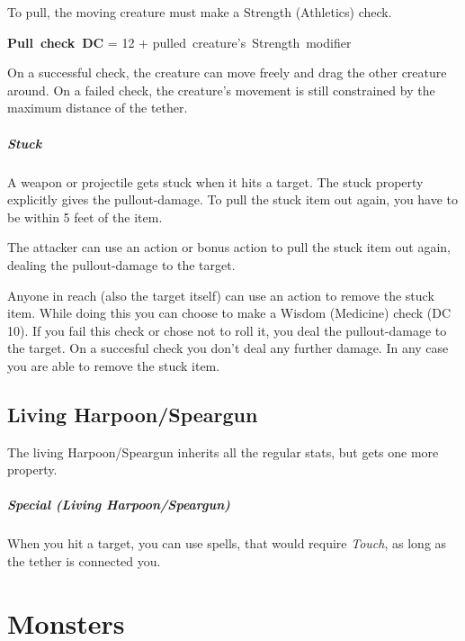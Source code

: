\documentclass[letterpaper,twocolumn,openany,nodeprecatedcode]{dndbook}
\begin{document}
To pull, the moving creature must make a Strength (Athletics) check.

\begin{center}
    \mbox{\bf Pull check DC} = \mbox{12} + \mbox{pulled creature's Strength modifier}
\end{center}

On a successful check, the creature can move freely and drag the other creature around.
On a failed check, the creature's movement is still constrained by the maximum distance of the tether.

\subparagraph{Stuck}
A weapon or projectile gets stuck when it hits a target.
The stuck property explicitly gives the pullout-damage.
To pull the stuck item out again, you have to be within 5 feet of the item.

The attacker can use an action or bonus action to pull the stuck item out again, dealing the pullout-damage to the target.

Anyone in reach (also the target itself) can use an action to remove the stuck item.
While doing this you can choose to make a Wisdom (Medicine) check (DC 10).
If you fail this check or chose not to roll it, you deal the pullout-damage to the target.
On a succesful check you don't deal any further damage.
In any case you are able to remove the stuck item.

\subsection{Living Harpoon/Speargun}
The living Harpoon/Speargun inherits all the regular stats, but gets one more property.

\subparagraph{Special (Living Harpoon/Speargun)}
When you hit a target, you can use spells, that would require \emph{Touch}, as long as the tether is connected you.

\section{Monsters}
\end{document}
